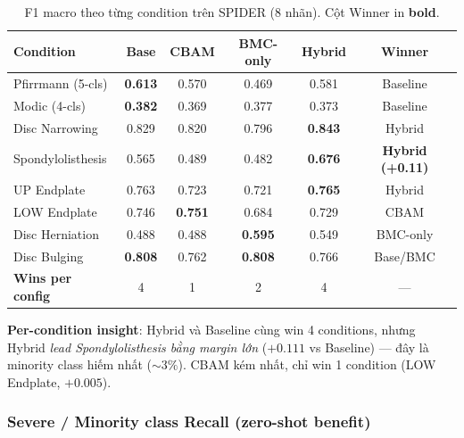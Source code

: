 \documentclass[11pt,a4paper]{article}
\newcommand{\best}[1]{\textcolor{best}{\textbf{#1}}}
\begin{document}
\begin{table}[h]
\centering
\caption{F1 macro theo từng condition trên SPIDER (8 nhãn). Cột Winner
in \best{bold}.}
\label{tab:spider_perclass_f1}
\small
\begin{tabular}{@{}lccccc@{}}
\toprule
\rowcolor{tablehdr}
Condition & Base & CBAM & BMC-only & Hybrid & Winner \\
\midrule
Pfirrmann (5-cls)    & \best{0.613} & 0.570 & 0.469 & 0.581 & Baseline \\
Modic (4-cls)        & \best{0.382} & 0.369 & 0.377 & 0.373 & Baseline \\
Disc Narrowing       & 0.829        & 0.820 & 0.796 & \best{0.843} & Hybrid \\
Spondylolisthesis    & 0.565        & 0.489 & 0.482 & \best{0.676} & \textbf{Hybrid (+0.11)} \\
UP Endplate          & 0.763        & 0.723 & 0.721 & \best{0.765} & Hybrid \\
LOW Endplate         & 0.746        & \best{0.751} & 0.684 & 0.729 & CBAM \\
Disc Herniation      & 0.488        & 0.488 & \best{0.595} & 0.549 & BMC-only \\
Disc Bulging         & \best{0.808} & 0.762 & \best{0.808} & 0.766 & Base/BMC \\
\midrule
\textbf{Wins per config} & 4 & 1 & 2 & 4 & --- \\
\bottomrule
\end{tabular}
\end{table}

\noindent\textbf{Per-condition insight}: Hybrid và Baseline cùng win 4
conditions, nhưng Hybrid \emph{lead Spondylolisthesis bằng margin lớn}
($+0.111$ vs Baseline) --- đây là minority class hiếm nhất ($\sim
3\%$). CBAM kém nhất, chỉ win 1 condition (LOW Endplate, $+0.005$).

\subsubsection*{Severe / Minority class Recall (zero-shot benefit)}
\end{document}
